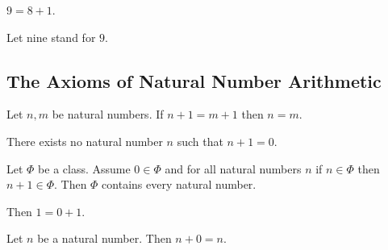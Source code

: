 \documentclass[10pt]{article}
\begin{document}
  \begin{forthel}
    \begin{definition}
      $9 = 8 + 1$.
    \end{definition}

    Let nine stand for $9$.
  \end{forthel}


  \subsection*{The Axioms of Natural Number Arithmetic}

  \begin{forthel}
    \begin{axiom}
      Let $n, m$ be natural numbers.
      If $n + 1 = m + 1$ then $n = m$.
    \end{axiom}
  \end{forthel}

  \begin{forthel}
    \begin{axiom}
      There exists no natural number $n$ such that $n + 1 = 0$.
    \end{axiom}
  \end{forthel}

  \begin{forthel}
    \begin{axiom}[Induction]
      Let $\Phi$ be a class.
      Assume $0 \in \Phi$ and for all natural numbers $n$ if $n \in \Phi$ then
      $n + 1 \in \Phi$.
      Then $\Phi$ contains every natural number.
    \end{axiom}
  \end{forthel}

  \begin{forthel}
    \begin{axiom}
      Then $1 = 0 + 1$.
    \end{axiom}
  \end{forthel}

  \begin{forthel}
    \begin{axiom}
      Let $n$ be a natural number.
      Then $n + 0 = n$.
    \end{axiom}
  \end{forthel}
\end{document}
